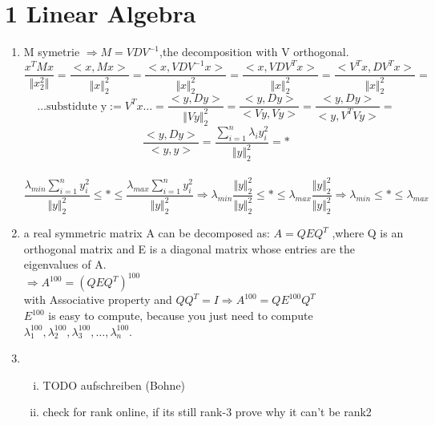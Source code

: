 \documentclass[12pt]{article}
\begin{document}

\section*{1 Linear Algebra}
\begin{enumerate}[1)]
    \item
        M symetrie $\Rightarrow M=VDV^{-1}$,the decomposition with V orthogonal.\\
        $$\frac{x^TMx}{\Vert x_2^2\Vert}=\frac{<x,Mx>}{\Vert x\Vert_2^2}=\frac{<x,VDV^{-1}x>}{\Vert x\Vert_2^2}=\frac{<x,VDV^Tx>}{\Vert x\Vert_2^2}=\frac{<V^Tx,DV^Tx>}{\Vert x\Vert_2^2}=$$$$\ldots \text{substidute y}:=V^Tx\ldots=\frac{<y,Dy>}{\Vert Vy\Vert_2^2}=\frac{<y,Dy>}{<Vy,Vy>}=\frac{<y,Dy>}{<y,V^TVy>}=$$$$\frac{<y,Dy>}{<y,y>}=\frac{\sum_{i=1}^{n}\lambda_iy_i^2}{\Vert y\Vert_2^2}=*$$\\$$\frac{\lambda_{min}\sum_{i=1}^{n}y_i^2}{\Vert y\Vert_2^2}\leq * \leq \frac{\lambda_{max}\sum_{i=1}^{n}y_i^2}{\Vert y\Vert_2^2}\Rightarrow \lambda_{min}\frac{\Vert y \Vert_2^2}{\Vert y\Vert_2^2}\leq * \leq \lambda_{max}\frac{\Vert y \Vert_2^2}{\Vert y\Vert_2^2} \Rightarrow \lambda_{min} \leq * \leq \lambda_{max}$$
    \item
        a real symmetric matrix A can be decomposed as: $A=QEQ^T$ ,where Q is an orthogonal matrix and E is a diagonal matrix whose entries are the eigenvalues of A.\\
    $\Rightarrow A^{100}=(QEQ^T)^{100}$\\
    with Associative property and $QQ^T = I \Rightarrow A^{100}=QE^{100}Q^{T}$\\
    $E^{100}$ is easy to compute, because you just need to compute $\lambda_1^{100},\lambda_2^{100},\lambda_3^{100},\ldots,\lambda_n^{100}$.\\

    \item
        \begin{enumerate}[(i)]
            \item 
                TODO aufschreiben (Bohne)
            \item
                check for rank online, if its still rank-3 prove why it can't be rank2
        \end{enumerate}


\end{enumerate}
\end{document}

